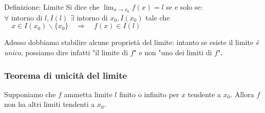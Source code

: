 \documentclass[x11names]{article}
\begin{document}
\begin{center}
\colorbox{myblue}{\begin{minipage}{5.75in}
\begin{blues}{Definizione: Limite}
Si dice che $\lim_{x\to x_0}f\left(x\right) = l$ se e solo se: \\
$\forall$ intorno di $l, I\left(l\right)$ $\exists$ intorno di $x_0, I\left(x_0\right)$ tale che $\quad x \in I\left(x_0\right) \backslash\{x_0\} \quad \Rightarrow \quad f\left(x\right) \in I\left(l\right)$ 
\end{blues}
\end{minipage}}       
\end{center}




Adesso dobbiamo stabilire alcune proprietà del limite: intanto se esiste il limite \textit{è unico}, possiamo dire infatti "il limite di $f$" e non "uno dei limiti di $f$".

\begin{center}
\colorbox{myred}{\begin{minipage}{5.75in}
\begin{redes}{}
\subsubsection{Teorema di unicità del limite} Supponiamo che $f$ ammetta limite $l$ finito o infinito per $x$ tendente a $x_0$. Allora $f$ non ha altri limiti tendenti a $x_0$.
\end{redes}
\end{minipage}}        
\end{center}
\end{document}
